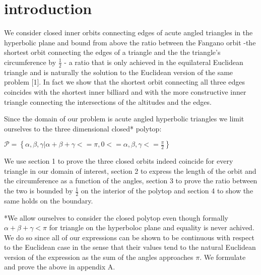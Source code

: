 \documentclass[a4paper,10pt]{article}
\title{}
\author{}
\begin{document}
\maketitle
\section{introduction}

We consider closed inner orbits connecting edges of acute angled triangles in the
hyperbolic plane and bound from above the ratio between the Fangano orbit -the
shortest orbit connecting the edges of a triangle and the the triangle's
circumference by $\frac{1}{2}$ - a ratio that is only achieved in the equilateral
Euclidean triangle and is naturally the solution to the Euclidean version of the
same problem [1].
In fact we show that the shortest orbit connecting all three edges coincides with
the shortest inner billiard and with the more constructive inner triangle 
connecting the intersections of the altitudes and the edges.

Since the domain of our problem is acute angled hyperbolic triangles we
limit ourselves to the three dimensional closed* polytop:

\begin{center}
   $\mathcal{P} = \left\{\alpha,\beta,\gamma| \alpha + \beta + \gamma <= \pi, 0 <= \alpha,\beta,\gamma <= \frac{\pi}{2}\right\}$
\end{center}

We use section 1 to prove the three closed orbits indeed coincide for
every triangle in our domain of interest, section 2 to express the length of
the orbit and the circumference as a function of the angles, section 3
to prove the ratio between the two is bounded by $\frac{1}{2}$ on the
interior of the polytop and section 4 to show the same holds on the
boundary.


*We allow ourselves to consider the closed polytop even though formally
$\alpha + \beta + \gamma < \pi$ for triangle on the hyperboloc plane and 
equality is never achived. We do so since all of our expressions can be shown
to be continuous with respect to the Euclidean case in the sense that their 
values tend to the natural Euclidean version of the expression as the
sum of the angles approaches $\pi$. We formulate and prove the above in
appendix A.
\end{document}
